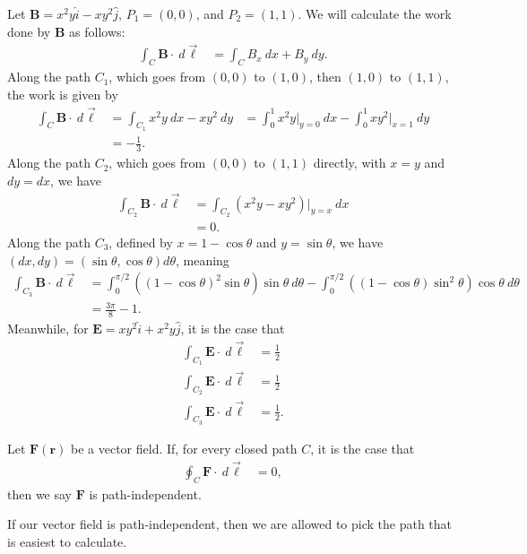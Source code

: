 \documentclass[10pt]{mypackage}
\begin{document}
\begin{example}
  Let $\mathbf{B} = x^2y\widehat{i} - xy^2\widehat{j}$, $P_1 = (0,0)$, and $P_2 = (1,1)$. We will calculate the work done by $\mathbf{B}$ as follows:
  \begin{align*}
    \int_{C}^{} \mathbf{B}\cdot\:d\vec{\ell} &= \int_{C}^{} B_x\:dx + B_y\:dy.
  \end{align*}
  Along the path $C_1$, which goes from $(0,0)$ to $(1,0)$, then $(1,0)$ to $(1,1)$, the work is given by
  \begin{align*}
    \int_{C}^{} \mathbf{B}\cdot\:d\vec{\ell} &= \int_{C_1}^{} x^2y\:dx-xy^2\:dy
                                             &= \int_{0}^{1} x^2y\bigr\vert_{y=0}\:dx - \int_{0}^{1} xy^2\bigr\vert_{x=1}\:dy\\
                                             &= -\frac{1}{3}.
  \end{align*}
  Along the path $C_2$, which goes from $(0,0)$ to $(1,1)$ directly, with $x = y$ and $dy = dx$, we have
  \begin{align*}
    \int_{C_2}^{} \mathbf{B}\cdot\:d\vec{\ell} &= \int_{C_2}^{} \left(x^2y-xy^2\right)\bigr\vert_{y=x}\:dx\\
                                               &= 0.
  \end{align*}
  Along the path $C_3$, defined by $x = 1-\cos\theta$ and $y = \sin\theta$, we have $\left(dx,dy\right) = \left(\sin\theta,\cos\theta\right)d\theta$, meaning
  \begin{align*}
    \int_{C_3}^{} \mathbf{B}\cdot\:d\vec{\ell} &= \int_{0}^{\pi/2} \left(\left(1-\cos\theta\right)^2\sin\theta\right)\sin\theta\:d\theta - \int_{0}^{\pi/2} \left(\left(1-\cos\theta\right)\sin^2\theta\right)\cos\theta\:d\theta\\
                                               &= \frac{3\pi}{8}-1.
  \end{align*}
  Meanwhile, for $\mathbf{E} = xy^2\widehat{i} + x^2y\widehat{j}$, it is the case that
  \begin{align*}
    \int_{C_1}^{} \mathbf{E}\cdot\:d\vec{\ell} &= \frac{1}{2}\\
    \int_{C_2}^{} \mathbf{E}\cdot\:d\vec{\ell} &= \frac{1}{2}\\
    \int_{C_3}^{} \mathbf{E}\cdot\:d\vec{\ell} &= \frac{1}{2}.
  \end{align*}
\end{example}
\begin{definition}
  Let $\mathbf{F}\left(\mathbf{r}\right)$ be a vector field. If, for every closed path $C$, it is the case that
  \begin{align*}
    \oint_{C}^{} \mathbf{F}\cdot\:d\vec{\ell} &= 0,
  \end{align*}
  then we say $\mathbf{F}$ is path-independent.
\end{definition}
If our vector field is path-independent, then we are allowed to pick the path that is easiest to calculate.\newline
\end{document}
